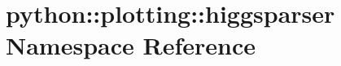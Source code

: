 \hypertarget{namespacepython_1_1plotting_1_1higgsparser}{
\section{python::plotting::higgsparser Namespace Reference}
\label{namespacepython_1_1plotting_1_1higgsparser}
}
